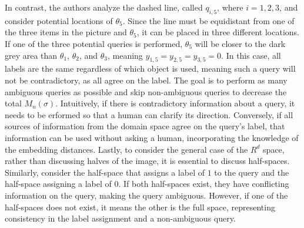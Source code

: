 \documentclass[
  letterpaper,
  numbers=noenddot,
  DIV=11]{scrreprt}
\theoremstyle{plain}
\theoremstyle{definition}
\theoremstyle{remark}
\begin{document}
In contrast, the authors analyze the dashed line, called \(q_{i,5}\),
where \(i={1,2,3}\), and consider potential locations of \(\theta_5\).
Since the line must be equidistant from one of the three items in the
picture and \(\theta_5\), it can be placed in three different locations.
If one of the three potential queries is performed, \(\theta_5\) will be
closer to the dark grey area than \(\theta_1\), \(\theta_2\), and
\(\theta_3\), meaning \(y_{1,5} = y_{2,5} = y_{3,5} = 0\). In this case,
all labels are the same regardless of which object is used, meaning such
a query will not be contradictory, as all agree on the label. The goal
is to perform as many ambiguous queries as possible and skip
non-ambiguous queries to decrease the total \(M_n(\sigma)\).
Intuitively, if there is contradictory information about a query, it
needs to be erformed so that a human can clarify its direction.
Conversely, if all sources of information from the domain space agree on
the query's label, that information can be used without asking a human,
incorporating the knowledge of the embedding distances. Lastly, to
consider the general case of the \(R^d\) space, rather than discussing
halves of the image, it is essential to discuss half-spaces. Similarly,
consider the half-space that assigns a label of \(1\) to the query and
the half-space assigning a label of \(0\). If both half-spaces exist,
they have conflicting information on the query, making the query
ambiguous. However, if one of the half-spaces does not exist, it means
the other is the full space, representing consistency in the label
assignment and a non-ambiguous query.
\end{document}
